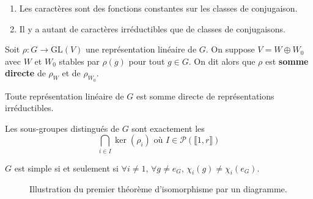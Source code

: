   \begin{proposition}
    \begin{enumerate}[label=(\roman*)]
      \item Les caractères sont des fonctions constantes sur les classes de conjugaison.
      \item Il y a autant de caractères irréductibles que de classes de conjugaisons.
    \end{enumerate}
  \end{proposition}

  \begin{definition}
    Soit $\rho : G \rightarrow \mathrm{GL}(V)$ une représentation linéaire de $G$. On suppose $V = W \oplus W_0$ avec $W$ et $W_0$ stables par $\rho(g)$ pour tout $g \in G$. On dit alors que $\rho$ est \textbf{somme directe} de $\rho_W$ et de $\rho_{W_0}$.
  \end{definition}

  \begin{theorem}[Maschke]
    Toute représentation linéaire de $G$ est somme directe de représentations irréductibles.
  \end{theorem}


  \begin{theorem}
    Les sous-groupes distingués de $G$ sont exactement les
    \[ \bigcap_{i \in I} \ker(\rho_i) \text{ où } I \in \mathcal{P}(\llbracket 1, r \rrbracket) \]
  \end{theorem}

  \begin{corollary}
    $G$ est simple si et seulement si $\forall i \neq 1$, $\forall g \neq e_G$, $\chi_i(g) \neq \chi_i(e_G)$.
  \end{corollary}

  \annexessection


  \begin{figure}[h]
    \begin{center}
    \end{center}
    \caption{Illustration du premier théorème d'isomorphisme par un diagramme.}
  \end{figure}

